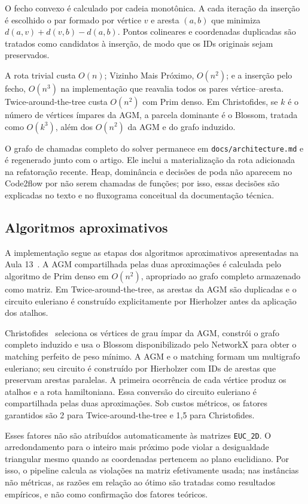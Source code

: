 \documentclass[12pt]{article}
\begin{document}
O fecho convexo é calculado por cadeia monotônica. A cada iteração da inserção
é escolhido o par formado por vértice $v$ e aresta $(a,b)$ que minimiza
$d(a,v)+d(v,b)-d(a,b)$. Pontos colineares e coordenadas duplicadas são tratados
como candidatos à inserção, de modo que os IDs originais sejam preservados.

A rota trivial custa $O(n)$; Vizinho Mais Próximo, $O(n^2)$; e a inserção pelo
fecho, $O(n^3)$ na implementação que reavalia todos os pares vértice--aresta.
Twice-around-the-tree custa $O(n^2)$ com Prim denso. Em Christofides, se $k$ é
o número de vértices ímpares da AGM, a parcela dominante é o Blossom, tratada
como $O(k^3)$, além dos $O(n^2)$ da AGM e do grafo induzido.

O grafo de chamadas completo do solver permanece em
\texttt{docs/architecture.md} e é regenerado junto com o artigo. Ele inclui a
materialização da rota adicionada na refatoração recente. Heap, dominância e
decisões de poda não aparecem no Code2flow por não serem chamadas de funções;
por isso, essas decisões são explicadas no texto e no fluxograma conceitual da
documentação técnica.

\subsection{Algoritmos aproximativos}

A implementação segue as etapas dos algoritmos aproximativos apresentadas na
Aula 13~\cite{vimieiro2026aula13}. A AGM compartilhada pelas duas aproximações
é calculada pelo algoritmo de Prim denso em $O(n^2)$, apropriado ao grafo
completo armazenado como matriz. Em Twice-around-the-tree, as arestas da AGM
são duplicadas e o circuito euleriano é construído explicitamente por
Hierholzer antes da aplicação dos atalhos.

Christofides~\cite{christofides1976} seleciona os vértices de grau ímpar da AGM, constrói o grafo
completo induzido e usa o Blossom disponibilizado pelo NetworkX para obter o
matching perfeito de peso mínimo. A AGM e o matching formam um multigrafo
euleriano; seu circuito é construído por Hierholzer com IDs de arestas que
preservam arestas paralelas. A primeira ocorrência de cada vértice produz os
atalhos e a rota hamiltoniana. Essa conversão do circuito euleriano é
compartilhada pelas duas aproximações. Sob custos métricos, os fatores
garantidos são 2 para Twice-around-the-tree e 1,5 para Christofides.

Esses fatores não são atribuídos automaticamente às matrizes \texttt{EUC\_2D}.
O arredondamento para o inteiro mais próximo pode violar a desigualdade
triangular mesmo quando as coordenadas pertencem ao plano euclidiano. Por isso,
o pipeline calcula as violações na matriz efetivamente usada; nas instâncias
não métricas, as razões em relação ao ótimo são tratadas como resultados
empíricos, e não como confirmação dos fatores teóricos.
\end{document}
